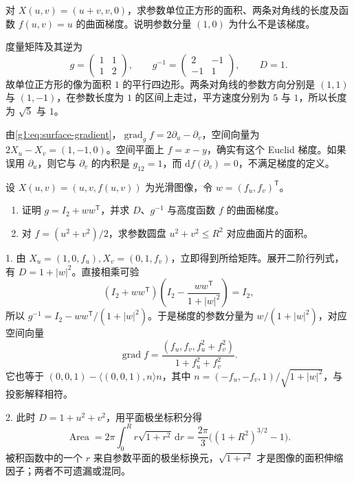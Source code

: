 \BookExercises

\begin{exercise}\label{g1:ex:oblique-metric-measurements}
	对 \(X(u,v)=(u+v,v,0)\)，求参数单位正方形的面积、两条对角线的长度及函数 \(f(u,v)=u\) 的曲面梯度。说明参数分量 \((1,0)\) 为什么不是该梯度。
\end{exercise}
\begin{solution}
	度量矩阵及其逆为
	\[
		g=\begin{pmatrix}1&1\\1&2\end{pmatrix},\qquad
		g^{-1}=\begin{pmatrix}2&-1\\-1&1\end{pmatrix},\qquad D=1.
	\]
	故单位正方形的像为面积 \(1\) 的平行四边形。两条对角线的参数方向分别是 \((1,1)\) 与 \((1,-1)\)，在参数长度为 \(1\) 的区间上走过，平方速度分别为 \(5\) 与 \(1\)，所以长度为 \(\sqrt5\) 与 \(1\)。

	由\eqref{g1:eq:surface-gradient}，\(\operatorname{grad}_gf=2\partial_u-\partial_v\)，空间向量为 \(2X_u-X_v=(1,-1,0)\)。空间平面上 \(f=x-y\)，确实有这个 Euclid 梯度。如果误用 \(\partial_u\)，则它与 \(\partial_v\) 的内积是 \(g_{12}=1\)，而 \(\mathrm{d}f(\partial_v)=0\)，不满足梯度的定义。
\end{solution}

\begin{exercise}\label{g1:ex:graph-area-gradient}
	设 \(X(u,v)=(u,v,f(u,v))\) 为光滑图像，令 \(w=(f_u,f_v)^{\mathsf T}\)。
	\begin{enumerate}
		\item 证明 \(g=I_2+ww^{\mathsf T}\)，并求 \(D\)、\(g^{-1}\) 与高度函数 \(f\) 的曲面梯度。
		\item 对 \(f=(u^2+v^2)/2\)，求参数圆盘 \(u^2+v^2\le R^2\) 对应曲面片的面积。
	\end{enumerate}
\end{exercise}
\begin{solution}
	1. 由 \(X_u=(1,0,f_u),X_v=(0,1,f_v)\)，立即得到所给矩阵。展开二阶行列式，有 \(D=1+|w|^2\)。直接相乘可验
	\[
		(I_2+ww^{\mathsf T})\left(I_2-\frac{ww^{\mathsf T}}{1+|w|^2}\right)=I_2,
	\]
	所以 \(g^{-1}=I_2-ww^{\mathsf T}/(1+|w|^2)\)。于是梯度的参数分量为 \(w/(1+|w|^2)\)，对应空间向量
	\[
		\operatorname{grad}f=\frac{(f_u,f_v,f_u^2+f_v^2)}{1+f_u^2+f_v^2}.
	\]
	它也等于 \((0,0,1)-\langle(0,0,1),n\rangle n\)，其中 \(n=(-f_u,-f_v,1)/\sqrt{1+|w|^2}\)，与投影解释相符。

	2. 此时 \(D=1+u^2+v^2\)，用平面极坐标积分得
	\[
		\operatorname{Area}=2\pi\int_0^Rr\sqrt{1+r^2}\,\mathrm{d}r
		=\frac{2\pi}{3}\bigl((1+R^2)^{3/2}-1\bigr).
	\]
	被积函数中的一个 \(r\) 来自参数平面的极坐标换元，\(\sqrt{1+r^2}\) 才是图像的面积伸缩因子；两者不可遗漏或混同。
\end{solution}

